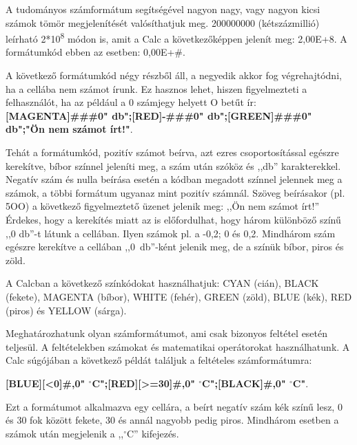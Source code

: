 A tudományos számformátum segítségével nagyon nagy, vagy
nagyon kicsi számok tömör megjelenítését valósíthatjuk
meg. 200000000 (kétszázmillió) leírható
2*10\textsuperscript{8} módon is, amit a Calc a
következőképpen jelenít meg: 2,00E+8. A formátumkód ebben
az esetben: 0,00E+\#.

A következő formátumkód négy részből áll, a negyedik
akkor fog végrehajtódni, ha a cellába nem számot írunk. Ez
hasznos lehet, hiszen figyelmezteti a felhasználót, ha az
például a 0 számjegy helyett O betűt ír:\\
{\sffamily\bfseries
[MAGENTA]\#\#\#0" db";[RED]-\#\#\#0" db";[GREEN]\#\#\#0" db";"Ön nem számot írt!"}.

Tehát a formátumkód, pozitív számot beírva, azt ezres
csoportosítással egészre kerekítve, bíbor színnel
jeleníti meg, a szám után szóköz és
,,db'' karakterekkel. Negatív
szám és nulla beírása esetén a kódban megadott színnel
jelennek meg a számok, a többi formátum ugyanaz mint pozitív
számnál. Szöveg beírásakor (pl. 5OO) a következő
figyelmeztető üzenet jelenik meg: ,,Ön nem
számot írt!'' Érdekes, hogy a kerekítés
miatt az is előfordulhat, hogy három különböző
színű ,,0 db''-t látunk a
cellában. Ilyen számok pl. a -0,2; 0 és 0,2. Mindhárom szám
egészre kerekítve a cellában ,,0~db''-ként jelenik meg,
de a színük bíbor, piros és zöld.

A Calcban a következő színkódokat használhatjuk: CYAN
(cián), BLACK (fekete), MAGENTA (bíbor), WHITE (fehér), GREEN
(zöld), BLUE (kék), RED (piros) és YELLOW (sárga).

Meghatározhatunk olyan számformátumot, ami csak bizonyos
feltétel esetén teljesül. A feltételekben számokat és
matematikai operátorokat használhatunk. A Calc súgójában a
következő példát találjuk a feltételes
számformátumra:


{\sffamily\bfseries
[BLUE][<0]\#,0" ${}^\circ$C";[RED][>=30]\#,0" ${}^\circ$C";[BLACK]\#,0" ${}^\circ$C"}.

Ezt a formátumot alkalmazva egy cellára, a beírt negatív szám
kék színű lesz, 0 és 30 fok között fekete, 30 és
annál nagyobb pedig piros. Mindhárom esetben a számok után
megjelenik a ,,$^\circ$C'' kifejezés.

